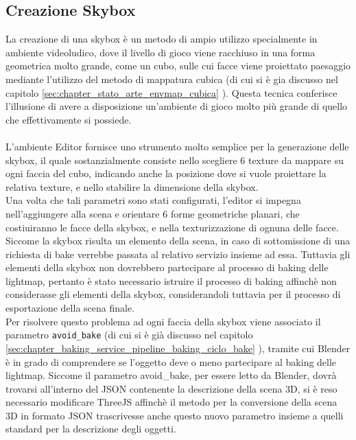 \subsection{Creazione Skybox}
\label{sec:chapter_creazione_scena_funzionalita_editor_skybox}
La creazione di una skybox è un metodo di ampio utilizzo specialmente in ambiente videoludico, dove il livello di gioco viene racchiuso in una forma geometrica molto grande, come un cubo, sulle cui facce viene proiettato paesaggio mediante l’utilizzo del metodo di mappatura cubica (di cui si è gia discusso nel capitolo \ref{sec:chapter_stato_arte_envmap_cubica} ). Questa tecnica conferisce l’illusione di avere a disposizione un’ambiente di gioco molto più grande di quello che effettivamente si possiede.
\\
\\
L’ambiente Editor fornisce uno strumento molto semplice per la generazione delle skybox, il quale sostanzialmente consiste nello scegliere 6 texture da mappare su ogni faccia del cubo, indicando anche la posizione dove si vuole proiettare la relativa texture, e nello stabilire la dimensione della skybox. 
\\
Una volta che tali parametri sono stati configurati, l’editor si impegna nell’aggiungere alla scena e orientare 6 forme geometriche planari, che costiuiranno le facce della skybox, e nella texturizzazione di ognuna delle facce.
\\
Siccome la skybox risulta un elemento della scena, in caso di sottomissione di una richiesta di bake verrebbe passata al relativo servizio insieme ad essa. Tuttavia gli elementi della skybox non dovrebbero partecipare al processo di baking delle lightmap, pertanto è stato necessario istruire il processo di baking affinchè non considerasse gli elementi della skybox, considerandoli tuttavia per il processo di esportazione della scena finale.
\\
Per risolvere questo problema ad ogni faccia della skybox viene associato il parametro \texttt{avoid\_bake} (di cui si è già discusso nel capitolo \ref{sec:chapter_baking_service_pipeline_baking_ciclo_bake} ), tramite cui Blender è in grado di comprendere se l’oggetto deve o meno partecipare al baking delle lightmap. Siccome il parametro avoid\_bake, per essere letto da Blender, dovrà trovarsi all’interno del JSON contenente la descrizione della scena 3D, si è reso necessario modificare ThreeJS affinchè il metodo per la conversione della scena 3D in formato JSON trascrivesse anche questo nuovo parametro insieme a quelli standard per la descrizione degli oggetti. 

